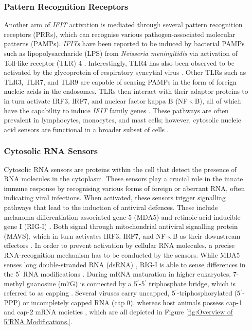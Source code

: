 \subsubsection{Pattern Recognition Receptors} \label{Pattern Recognition Receptors}
Another arm of \textit{IFIT} activation is mediated through several pattern recognition receptors (PRRs), which can recognise various pathogen-associated molecular patterns (PAMPs). \textit{IFITs} have been reported to be induced by bacterial PAMPs such as lipopolysaccharide (LPS) from \textit{Neisseria meningitidis} via activation of Toll-like receptor (TLR) 4 \cite{Zhou2013InterferonDefense.}. Interestingly, TLR4 has also been observed to be activated by the glycoprotein of respiratory syncytial virus \cite{Funchal2015RespiratoryNeutrophils}. Other TLRs such as TLR3, TLR7, and TLR9 are capable of sensing PAMPs in the form of foreign nucleic acids in the endosomes. TLRs then interact with their adaptor proteins to in turn activate IRF3, IRF7, and nuclear factor kappa B (NF$\upkappa$B), all of which have the capability to induce \textit{IFIT} family genes \cite{Diamond2013TheProteins}. These pathways are often prevalent in lymphocytes, monocytes, and mast cells; however, cytosolic nucleic acid sensors are functional in a broader subset of cells \cite{Ablasser2011WhereFit}.

\subsubsection{Cytosolic RNA Sensors} \label{Cytosolic Nuclec Acid Sensors}
Cytosolic RNA sensors are proteins within the cell that detect the presence of RNA molecules in the cytoplasm. These sensors play a crucial role in the innate immune response by recognising various forms of foreign or aberrant RNA, often indicating viral infections. When activated, these sensors trigger signalling pathways that lead to the induction of antiviral defences. These include melanoma differentiation-associated gene 5 (MDA5) and retinoic acid-inducible gene I (RIG-I) \cite{Vladimer2014IFITs:Proteins}. Both signal through mitochondrial antiviral signalling protein (MAVS), which in turn activates IRF3, IRF7, and NF$\upkappa$B as their downstream effectors \cite{Ashley2019Interferon-IndependentCytomegalovirus}. In order to prevent activation by cellular RNA molecules, a precise RNA-recognition mechanism has to be conducted by the sensors. While MDA5 senses long double-stranded RNA (dsRNA) \cite{Brisse2019ComparativeMDA5}, RIG-I is able to sense differences in the 5$^{\prime}$ RNA modifications \cite{Schlee2016DiscriminatingSensing}. During mRNA maturation in higher eukaryotes, 7-methyl guanosine (m7G) is connected by a 5$^{\prime}$-5$^{\prime}$ triphosphate bridge, which is referred to as capping \cite{Devarkar2016StructuralRIG-I, Ramanathan2016MRNAApplications}. Several viruses carry uncapped, 5$^{\prime}$-triphosphorylated (5$^{\prime}$-PPP) or incompletely capped RNA (cap 0), whereas host animals possess cap-1 and cap-2 mRNA moieties \cite{Choi2018ACaps}, which are all depicted in Figure \ref{fig:Overview of 5'RNA Modifications.}.

